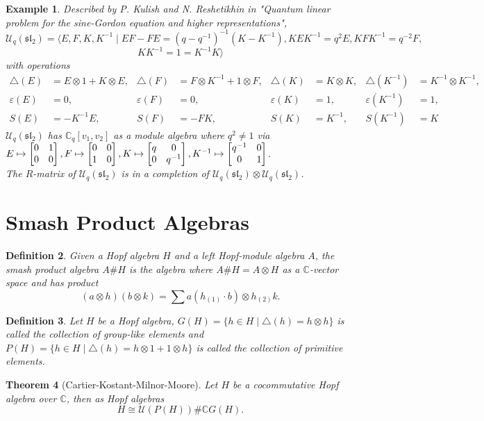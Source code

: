 \documentclass[12pt,a4paper]{article}
\newtheorem{theorem}{Theorem}[section]
\newtheorem{example}[theorem]{Example}
\newtheorem{definition}[theorem]{Definition}
\newcommand\1{_{(1)}}
\newcommand\2{_{(2)}}
\begin{document}
\begin{example}
Described by P. Kulish and N. Reshetikhin in "Quantum linear problem for the sine-Gordon equation and higher representations", 
\[
\mathcal{U}_q(\mathfrak{sl_2})=\langle E,F,K,K^{-1}\;\vert\; EF-FE=(q-q^{-1})^{-1}(K-K^{-1}), KEK^{-1}=q^2E, KFK^{-1}=q^{-2}F, \]\[KK^{-1}=1=K^{-1}K\rangle
\]
with operations
\begin{align*}
\triangle(E)&=E\otimes 1+K\otimes E, & \triangle(F)&=F\otimes K^{-1}+1\otimes F, & \triangle(K)&=K\otimes K, & \triangle(K^{-1})&=K^{-1}\otimes K^{-1},\\
\varepsilon(E)&=0, & \varepsilon(F)&=0, & \varepsilon(K)&=1, & \varepsilon(K^{-1})&=1,\\
S(E)&=-K^{-1}E, & S(F)&=-FK, & S(K)&=K^{-1}, & S(K^{-1})&=K
\end{align*}
$\mathcal{U}_q(\mathfrak{sl_2})$ has $\mathbb{C}_q[v_1,v_2]$ as a module algebra where $q^2\neq 1$ via $E\mapsto \begin{bmatrix}0&1\\0&0\end{bmatrix}, F\mapsto \begin{bmatrix}0&0\\1&0\end{bmatrix}, \\K\mapsto \begin{bmatrix}q&0\\0&q^{-1}\end{bmatrix}, K^{-1}\mapsto\begin{bmatrix} q^{-1}&0\\0&1\end{bmatrix}$.
\\The $R$-matrix of $\mathcal{U}_q(\mathfrak{sl_2})$ is in a completion of $\mathcal{U}_q(\mathfrak{sl_2})\otimes \mathcal{U}_q(\mathfrak{sl_2})$.
\end{example}

\section{Smash Product Algebras}

\begin{definition}
Given a Hopf algebra $H$ and a left Hopf-module algebra $A$, the smash product algebra $A\# H$ is the algebra where $A\#H=A\otimes H$ as a $\mathbb{C}$-vector space and has product
\[
(a\otimes h)(b\otimes k)=\sum a(h\1\cdot b)\otimes h\2 k.
\]
\end{definition}

\begin{definition}
    Let $H$ be a Hopf algebra, $G(H)=\{h\in H\;\vert\; \triangle(h)=h\otimes h\}$ is called the collection of group-like elements and $P(H)=\{h\in H\;\vert\; \triangle(h)=h\otimes 1+1\otimes h\}$ is called the collection of primitive elements.
\end{definition}

\begin{theorem}[Cartier-Kostant-Milnor-Moore]
Let $H$ be a cocommutative Hopf algebra over $\mathbb{C}$, then as Hopf algebras
\[
H\cong \mathcal{U}(P(H))\# \mathbb{C}G(H).    
\]
\end{theorem}
\end{document}
